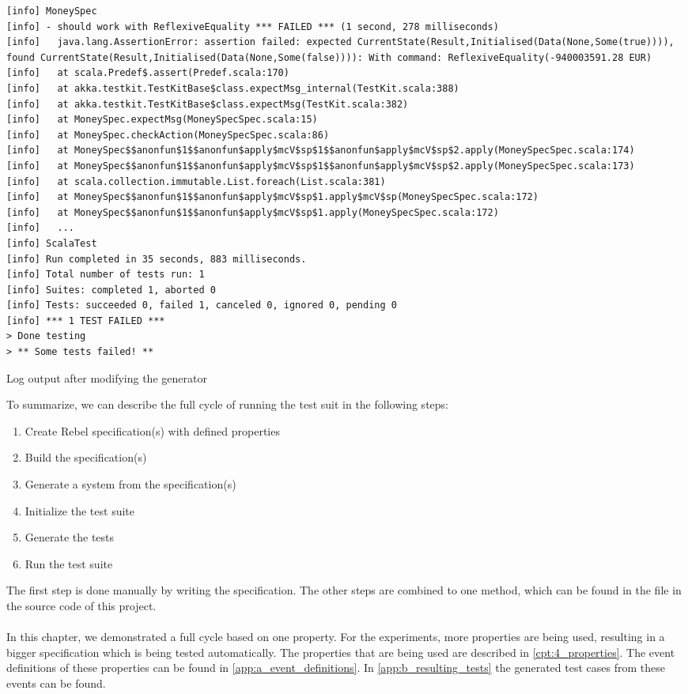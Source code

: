 \FloatBarrier
\begin{sourcecode}[h!]
\begin{lstlisting}[language=Log]
[info] MoneySpec
[info] - should work with ReflexiveEquality *** FAILED *** (1 second, 278 milliseconds)
[info]   java.lang.AssertionError: assertion failed: expected CurrentState(Result,Initialised(Data(None,Some(true)))), found CurrentState(Result,Initialised(Data(None,Some(false)))): With command: ReflexiveEquality(-940003591.28 EUR)
[info]   at scala.Predef$.assert(Predef.scala:170)
[info]   at akka.testkit.TestKitBase$class.expectMsg_internal(TestKit.scala:388)
[info]   at akka.testkit.TestKitBase$class.expectMsg(TestKit.scala:382)
[info]   at MoneySpec.expectMsg(MoneySpecSpec.scala:15)
[info]   at MoneySpec.checkAction(MoneySpecSpec.scala:86)
[info]   at MoneySpec$$anonfun$1$$anonfun$apply$mcV$sp$1$$anonfun$apply$mcV$sp$2.apply(MoneySpecSpec.scala:174)
[info]   at MoneySpec$$anonfun$1$$anonfun$apply$mcV$sp$1$$anonfun$apply$mcV$sp$2.apply(MoneySpecSpec.scala:173)
[info]   at scala.collection.immutable.List.foreach(List.scala:381)
[info]   at MoneySpec$$anonfun$1$$anonfun$apply$mcV$sp$1.apply$mcV$sp(MoneySpecSpec.scala:172)
[info]   at MoneySpec$$anonfun$1$$anonfun$apply$mcV$sp$1.apply(MoneySpecSpec.scala:172)
[info]   ...
[info] ScalaTest
[info] Run completed in 35 seconds, 883 milliseconds.
[info] Total number of tests run: 1
[info] Suites: completed 1, aborted 0
[info] Tests: succeeded 0, failed 1, canceled 0, ignored 0, pending 0
[info] *** 1 TEST FAILED ***
> Done testing
> ** Some tests failed! **
\end{lstlisting}
\caption{Log output after modifying the generator}
\label{lst:ch3_log_testrun_failed}
\end{sourcecode}
\FloatBarrier

To summarize, we can describe the full cycle of running the test suit in the following steps:
\begin{enumerate}
\item Create Rebel specification(s) with defined properties
\item Build the specification(s)
\item Generate a system from the specification(s)
\item Initialize the test suite
\item Generate the tests
\item Run the test suite
\end{enumerate}
The first step is done manually by writing the specification. The other steps are combined to one method, which can be found in the  file in the source code of this project.\\
\\
In this chapter, we demonstrated a full cycle based on one property. For the experiments, more properties are being used, resulting in a bigger specification which is being tested automatically. The properties that are being used are described in \autoref{cpt:4_properties}. The event definitions of these properties can be found in \autoref{app:a_event_definitions}. In \autoref{app:b_resulting_tests} the generated test cases from these events can be found.

